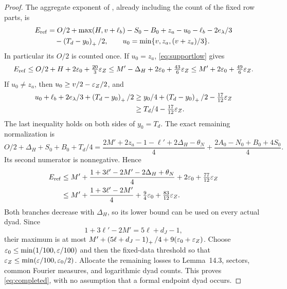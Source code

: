 \begin{proof}
The aggregate exponent of , already including the count of the fixed row parts, is
\begin{equation}\label{eq:Eref}
 \begin{split}
 E_{\rm ref}&=O/2+\max(H,v+\ell_b)-S_0-B_0+z_a-u_0-\ell_b-2e_\lambda/3\\
 &\quad-\left(T_d-y_0\right)_+/2,\qquad
 u_0=\min\{v,z_a,(v+z_a)/3\}.
 \end{split}
\end{equation}
In particular its $O/2$ is counted once. If $u_0=z_a$, \eqref{eq:supportlow} gives
\[
 E_{\rm ref}\le O/2+H+2\varepsilon_0+\tfrac{20}{3}\varepsilon_Z
 \le M'-\Delta_H+2\varepsilon_0+\tfrac{43}{6}\varepsilon_Z
 \le M'+2\varepsilon_0+\tfrac{49}{6}\varepsilon_Z.
\]
If $u_0\ne z_a$, then $u_0\ge v/2-\varepsilon_Z/2$, and
\begin{align*}
 u_0+\ell_b+2e_\lambda/3+\left(T_d-y_0\right)_+/2
 &\ge y_0/4+\left(T_d-y_0\right)_+/2-\tfrac{17}{12}\varepsilon_Z\\
 &\ge T_d/4-\tfrac{17}{12}\varepsilon_Z.
\end{align*}
The last inequality holds on both sides of $y_0=T_d$. The exact remaining normalization is
\[
 O/2+\Delta_H+S_0+B_0+T_d/4
 =\frac{2M'+2z_a-1-\ell'+2\Delta_H-\theta_N}{4}
  +\frac{2A_0-N_0+B_0+4S_0}{4}.
\]
Its second numerator is nonnegative. Hence
\begin{align*}
 E_{\rm ref}
 &\le M'+\frac{1+3\ell'-2M'-2\Delta_H+\theta_N}{4}
          +2\varepsilon_0+\tfrac{77}{12}\varepsilon_Z\\
 &\le M'+\frac{1+3\ell'-2M'}4
          +\tfrac94\varepsilon_0+\tfrac{83}{12}\varepsilon_Z.
\end{align*}
Both branches decrease with $\Delta_H$, so its lower bound can be used on every actual dyad. Since
\[
 1+3\ell'-2M'=5\ell+d_J-1,
\]
their maximum is at most $M'+\left(5\ell+d_J-1\right)_+/4+9(\varepsilon_0+\varepsilon_Z)$. Choose $\varepsilon_0\le\min(1/100,\varepsilon/100)$ and then the fixed-data threshold so that $\varepsilon_Z\le\min(\varepsilon/100,\varepsilon_0/2)$. Allocate the remaining losses to Lemma~14.3, sectors, common Fourier measures, and logarithmic dyad counts. This proves \eqref{eq:completed}, with no assumption that a formal endpoint dyad occurs.


\end{proof}
